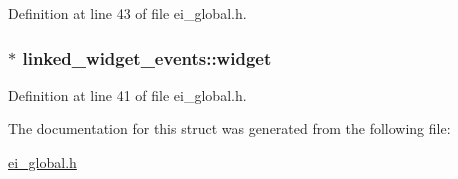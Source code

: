 Definition at line 43 of file ei\_\-global.h.\hypertarget{structlinked__widget__events_a4ed4583052de8776f7314ad141d24bc4}{
\subsubsection[{widget}]{$\ast$ {\bf linked\_\-widget\_\-events::widget}}}
\label{structlinked__widget__events_a4ed4583052de8776f7314ad141d24bc4}


Definition at line 41 of file ei\_\-global.h.

The documentation for this struct was generated from the following file:\begin{DoxyCompactItemize}
\item 
\hyperlink{ei__global_8h}{ei\_\-global.h}\end{DoxyCompactItemize}
